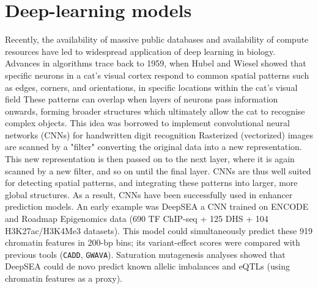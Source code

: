 

\section{Deep-learning models}
\label{sect:deep-learning-models}
Recently, the availability of massive public databases and availability of compute resources have led to widespread application of deep learning in biology. Advances in algorithms trace back to 1959, when Hubel and Wiesel showed that specific neurons in a cat's visual cortex respond to common spatial patterns such as edges, corners, and orientations, in specific locations within the cat's visual field These patterns can overlap when layers of neurons pass information onwards, forming broader structures which ultimately allow the cat to recognise complex objects. This idea was borrowed to implement convolutional neural networks (CNNs) for handwritten digit recognition Rasterized (vectorized) images are scanned by a "filter"\llap{,} converting the original data into a new representation. This new representation is then passed on to the next layer, where it is again scanned by a new filter, and so on until the final layer. CNNs are thus well suited for detecting spatial patterns, and integrating these patterns into larger, more global structures. As a result, CNNs have been successfully used in enhancer prediction models. An early example was DeepSEA a CNN trained on ENCODE and Roadmap Epigenomics data (690 TF ChIP-seq + 125 DHS + 104 H3K27ac/H3K4Me3 datasets). This model could simultaneously predict these 919 chromatin features in 200-bp bins; its variant-effect scores were compared with previous tools (\verb|CADD|, \verb|GWAVA|). Saturation mutagenesis analyses showed that DeepSEA could de novo predict known allelic imbalances and eQTLs (using chromatin features as a proxy).


